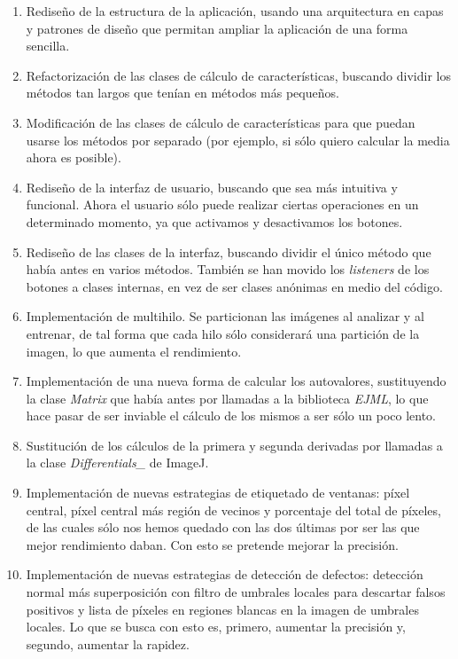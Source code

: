 \begin{enumerate}
\item Rediseño de la estructura de la aplicación, usando una arquitectura en capas y patrones de diseño que permitan ampliar la aplicación de una forma sencilla.
\item Refactorización de las clases de cálculo de características, buscando dividir los métodos tan largos que tenían en métodos más pequeños.
\item Modificación de las clases de cálculo de características para que puedan usarse los métodos por separado (por ejemplo, si sólo quiero calcular la media ahora es posible).
\item Rediseño de la interfaz de usuario, buscando que sea más intuitiva y funcional. Ahora el usuario sólo puede realizar ciertas operaciones en un determinado momento, ya que activamos y desactivamos los botones.
\item Rediseño de las clases de la interfaz, buscando dividir el único método que había antes en varios métodos. También se han movido los \textit{listeners} de los botones a clases internas, en vez de ser clases anónimas en medio del código.
\item Implementación de multihilo. Se particionan las imágenes al analizar y al entrenar, de tal forma que cada hilo sólo considerará una partición de la imagen, lo que aumenta el rendimiento.
\item Implementación de una nueva forma de calcular los autovalores, sustituyendo la clase \textit{Matrix} que había antes por llamadas a la biblioteca \textit{EJML}, lo que hace pasar de ser inviable el cálculo de los mismos a ser sólo un poco lento.
\item Sustitución de los cálculos de la primera y segunda derivadas por llamadas a la clase \textit{Differentials\_} de ImageJ.
\item Implementación de nuevas estrategias de etiquetado de ventanas: píxel central, píxel central más región de vecinos y porcentaje del total de píxeles, de las cuales sólo nos hemos quedado con las dos últimas por ser las que mejor rendimiento daban. Con esto se pretende mejorar la precisión.
\item Implementación de nuevas estrategias de detección de defectos: detección normal más superposición con filtro de umbrales locales para descartar falsos positivos y lista de píxeles en regiones blancas en la imagen de umbrales locales. Lo que se busca con esto es, primero, aumentar la precisión y, segundo, aumentar la rapidez.

\end{enumerate}
